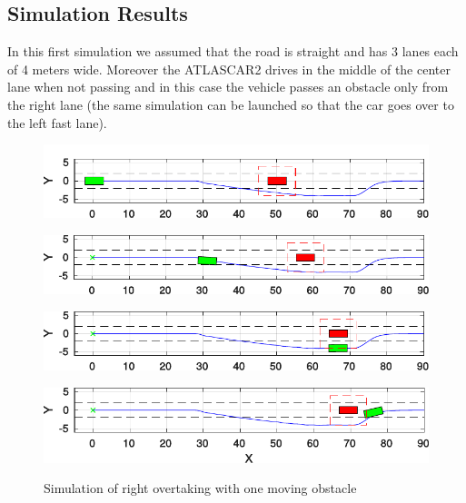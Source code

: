 \documentclass[conference, 11pt]{IEEEtran}
\begin{document}
\subsection{Simulation Results}
In this first simulation we assumed that the road is straight and has 3 lanes each of 4 meters wide. Moreover the ATLASCAR2 drives in the middle of the center lane when not passing and in this case the vehicle passes an obstacle only from the right lane (the same simulation can be launched so that the car goes over to the left fast lane).
\begin{figure}[!h]
	\centering
	\includegraphics[width=1\columnwidth]{../../MATLAB/one_obstacle_right_overtaking/figure/overtaking_paper/overtaking_start.pdf}
	\label{fig:obstacleAvoidance_start}
\end{figure}
\vspace{-3em}
\begin{figure}[!h]
	\centering
	\includegraphics[width=1\columnwidth]{../../MATLAB/one_obstacle_right_overtaking/figure/overtaking_paper/overtaking_middle.pdf}
	\label{fig:obstacleAvoidance_middle}
\end{figure}
\vspace{-3em}
\begin{figure}[!h]
	\centering
	\includegraphics[width=1\columnwidth]{../../MATLAB/one_obstacle_right_overtaking/figure/overtaking_paper/overtaking_middle_end.pdf}
	\label{fig:obstacleAvoidance_middle_end}
\end{figure}
\vspace{-3em}
\begin{figure}[!h]
	\centering
	\includegraphics[width=1\columnwidth]{../../MATLAB/one_obstacle_right_overtaking/figure/overtaking_paper/overtaking_end.pdf}
	\label{fig:obstacleAvoidance_end}
	\vspace{-1.2em}
	\caption{Simulation of right overtaking with one moving obstacle}
\end{figure}
\end{document}

